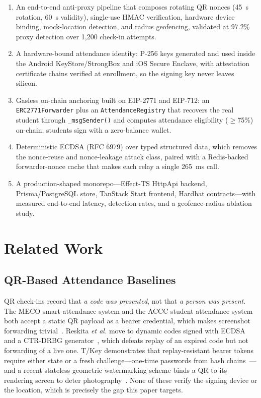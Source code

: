 \documentclass[conference]{IEEEtran}
\begin{document}
\begin{enumerate}
  \item An end-to-end anti-proxy pipeline that composes rotating QR nonces
        (45~s rotation, 60~s validity), single-use HMAC verification,
        hardware device binding, mock-location detection, and radius
        geofencing, validated at $97.2\%$ proxy detection over 1{,}200
        check-in attempts.
  \item A hardware-bound attendance identity: P-256 keys generated and used
        inside the Android KeyStore/StrongBox and iOS Secure Enclave, with
        attestation certificate chains verified at enrollment, so the signing
        key never leaves silicon.
  \item Gasless on-chain anchoring built on EIP-2771 and EIP-712: an
        \texttt{ERC2771Forwarder} plus an
        \texttt{AttendanceRegistry} that recovers the real student through
        \texttt{\_msgSender()} and computes attendance eligibility
        ($\geq$75\%) on-chain; students sign with a zero-balance wallet.
  \item Deterministic ECDSA (RFC 6979) over typed structured data, which
        removes the nonce-reuse and nonce-leakage attack class, paired with a
        Redis-backed forwarder-nonce cache that makes each relay a single
        265~ms call.
  \item A production-shaped monorepo---Effect-TS HttpApi backend,
        Prisma/PostgreSQL store, TanStack Start frontend, Hardhat
        contracts---with measured end-to-end latency, detection rates, and a
        geofence-radius ablation study.
\end{enumerate}

\section{Related Work}
\subsection{QR-Based Attendance Baselines}
QR check-ins record that \emph{a code was presented}, not that \emph{a person
was present}. The MECO smart attendance system and the ACCC student attendance
system both accept a static QR payload as a bearer credential, which makes
screenshot forwarding trivial~\cite{nuhi2020smartattendance,liew2021qrattendance}.
Reskita \emph{et al.} move to dynamic codes signed with ECDSA and a CTR-DRBG
generator~\cite{reskita2023dynamicqr}, which defeats replay of an expired code
but not forwarding of a live one. T/Key demonstrates that replay-resistant
bearer tokens require either state or a fresh challenge---one-time passwords
from hash chains~\cite{kogan2017tkey}---and a recent stateless geometric
watermarking scheme binds a QR to its rendering screen to deter
photography~\cite{albayan2026statelessgeometricwatermark}. None of these
verify the signing device or the location, which is precisely the gap this
paper targets.
\end{document}
